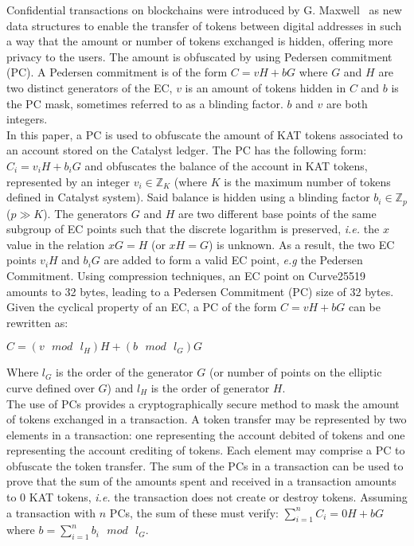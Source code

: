 Confidential transactions on blockchains were introduced by G. Maxwell~\cite{confidential} as new data structures to enable the transfer of tokens between digital addresses in such a way that the amount or number of tokens exchanged is hidden, offering more privacy to the users. The amount is obfuscated by using Pedersen commitment (PC). A Pedersen commitment is of the form $C = vH + bG$ where $G$ and $H$ are two distinct generators of the EC, $v$ is an amount of tokens hidden in $C$ and $b$ is the PC mask, sometimes referred to as a blinding factor. $b$ and $v$ are both integers.\\

In this paper, a PC is used to obfuscate the amount of KAT tokens associated to an account stored on the Catalyst ledger. The PC has the following form: $C_{i} = v_{i}H + b_{i}G$ and obfuscates the balance of the account in KAT tokens, represented by an integer $v_{i} \in \mathbb{Z}_K$ (where $K$ is the maximum number of tokens defined in Catalyst system). Said balance is hidden using a blinding factor $b_{i} \in \mathbb{Z}_p$ ($p \gg K$). The generators $G$ and $H$ are two different base points of the same subgroup of EC points such that the discrete logarithm is preserved, \textit{i.e.} the $x$ value in the relation $xG = H$ (or $xH = G$) is unknown. As a result, the two EC points $v_{i}H$ and $b_{i}G$ are added to form a valid EC point, \textit{e.g} the Pedersen Commitment. Using compression techniques, an EC point on Curve25519 amounts to 32 bytes, leading to a Pedersen Commitment (PC) size of 32 bytes.\\

Given the cyclical property of an EC, a PC of the form $C = vH + bG$ can be rewritten as:
\begin{center}
$C = (v \text{ $mod$ } l_H) H + (b \text{ $mod$ } l_G) G$
\end{center}

Where $l_G$ is the order of the generator $G$ (or number of points on the elliptic curve defined over $G$) and $l_H$ is the order of generator $H$.\\ 

The use of PCs provides a cryptographically secure method to mask the amount of tokens exchanged in a transaction. A token transfer may be represented by two elements in a transaction: one representing the account debited of tokens and one representing the account crediting of tokens. Each element may comprise a PC to obfuscate the token transfer. The sum of the PCs in a transaction can be used to prove that the sum of the amounts spent and received in a transaction amounts to 0 KAT tokens, \textit{i.e.} the transaction does not create or destroy tokens. Assuming a transaction with $n$ PCs, the sum of these must verify: $\sum_{i=1}^n C_i = 0H + bG$ where $b = \sum_{i=1}^n b_i \text{ $mod$ } l_G$. \\

